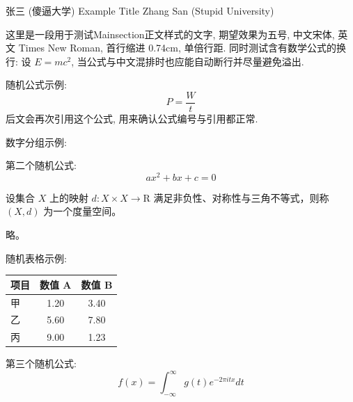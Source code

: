 \documentclass[twocolumn]{tem}
\begin{document}
{张三}
{(傻逼大学)}
{Example Title}
{Zhang San}
{(Stupid University)}



这里是一段用于测试Mainsection正文样式的文字, 期望效果为五号, 中文宋体, 英文 Times New Roman, 首行缩进 0.74cm, 单倍行距. 同时测试含有数学公式的换行: 设 $E=mc^2$, 当公式与中文混排时也应能自动断行并尽量避免溢出.

随机公式示例:
\begin{equation}
\label{eq:energy-balance}
P = \frac{W}{t}
\end{equation}
后文会再次引用这个公式, 用来确认公式编号与引用都正常.

数字分组示例: 

第二个随机公式:
\begin{equation}
\label{eq:quadratic}
ax^2 + bx + c = 0
\end{equation}
\zhlipsum[1]

设集合 $X$ 上的映射 $d: X\times X\to \mathrm{R}$ 满足非负性、对称性与三角不等式，则称 $(X,d)$ 为一个度量空间。

\Proof{}
略。


\zhlipsum[2]

随机表格示例:
\begin{table}[htbp]
\centering
{}
\XtuTableSetup
\begin{tabular}{@{}L C C@{}}
\toprule
项目 & 数值 A & 数值 B \\
\midrule
甲 & 1.20 & 3.40 \\
乙 & 5.60 & 7.80 \\
丙 & 9.00 & 1.23 \\
\bottomrule
\end{tabular}
\end{table}

第三个随机公式:
\begin{equation}
\label{eq:random}
f(x) = \int_{-\infty}^{\infty} g(t) e
^{-2\pi i t x} dt
\end{equation}
\end{document}
